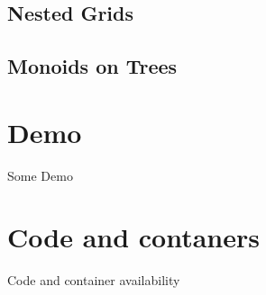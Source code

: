\documentclass{beamer}
\begin{document}
\subsection{Nested Grids}
\begin{frame}
\begin{block}

\end{block}
\end{frame}
\subsection{Monoids on Trees}
\begin{frame}
\begin{block}

\end{block}
\end{frame}
\section{Demo}
\begin{frame}{Some Demo}
\begin{block}

\end{block}
\end{frame}
\section{Code and contaners}

\begin{frame}{Code and container availability}

\end{frame}
\end{document}
